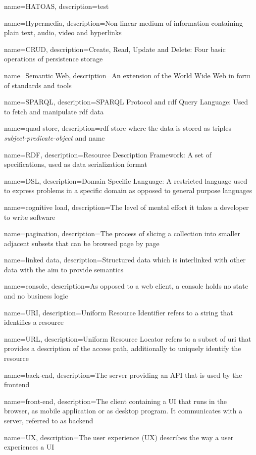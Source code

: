 {
    name={HATOAS},
    description={test}
}

{
    name={Hypermedia},
    description={Non-linear medium of information containing plain text, audio, video and hyperlinks}
}

{
    name={CRUD},
    description={Create, Read, Update and Delete: Four basic operations of persistence storage}
}

{
    name={Semantic Web},
    description={An extension of the World Wide Web in form of standards and tools}
}

{
    name={SPARQL},
    description={SPARQL Protocol and \gls{rdf} Query Language: Used to fetch and manipulate \gls{rdf} data}
}

{
    name={quad store},
    description={\gls{rdf} store where the data is stored as triples \textit{subject-predicate-object} and name}
}

{
    name={RDF},
    description={Resource Description Framework: A set of specifications, used as data serialization format}
}

{
    name={DSL},
    description={Domain Specific Language: A restricted language used to express problems in a specific domain as opposed to general purpose languages}
}

{
    name={cognitive load},
    description={The level of mental effort it takes a developer to write software}
}

{
    name={pagination},
    description={The process of slicing a collection into smaller adjacent subsets that can be browsed page by page}
}

{
    name={linked data},
    description={Structured data which is interlinked with other data with the aim to provide semantics}
}

{
    name={console},
    description={As opposed to a web client, a console holds no state and no business logic}
}

{
    name={URI},
    description={Uniform Resource Identifier refers to a string that identifies a resource}
}

{
    name={URL},
    description={Uniform Resource Locator refers to a subset of \gls{uri} that provides a description of the access path, additionally to uniquely identify the resource}
}

{
    name={back-end},
    description={The server providing an API that is used by the \gls{frontend}}
}

{
    name={front-end},
    description={The client containing a UI that runs in the browser, as mobile application or as desktop program. It communicates with a server, referred to as \gls{backend}}
}

{
    name={UX},
    description={The user experience (UX) describes the way a user experiences a UI}
}
